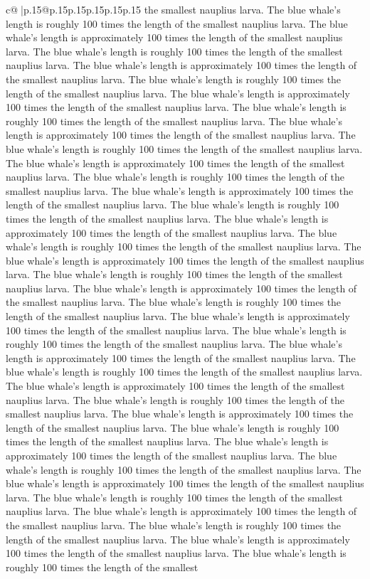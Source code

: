 \documentclass{article}
\begin{document}
{\begin{supertabular}{c@{$\;$}|p{.15\linewidth}@{}p{.15\linewidth}p{.15\linewidth}p{.15\linewidth}p{.15\linewidth}p{.15\linewidth}}
{{{the smallest nauplius larva. The blue whale's length is roughly 100 times the length of the smallest nauplius larva. The blue whale's length is approximately 100 times the length of the smallest nauplius larva. The blue whale's length is roughly 100 times the length of the smallest nauplius larva. The blue whale's length is approximately 100 times the length of the smallest nauplius larva. The blue whale's length is roughly 100 times the length of the smallest nauplius larva. The blue whale's length is approximately 100 times the length of the smallest nauplius larva. The blue whale's length is roughly 100 times the length of the smallest nauplius larva. The blue whale's length is approximately 100 times the length of the smallest nauplius larva. The blue whale's length is roughly 100 times the length of the smallest nauplius larva. The blue whale's length is approximately 100 times the length of the smallest nauplius larva. The blue whale's length is roughly 100 times the length of the smallest nauplius larva. The blue whale's length is approximately 100 times the length of the smallest nauplius larva. The blue whale's length is roughly 100 times the length of the smallest nauplius larva. The blue whale's length is approximately 100 times the length of the smallest nauplius larva. The blue whale's length is roughly 100 times the length of the smallest nauplius larva. The blue whale's length is approximately 100 times the length of the smallest nauplius larva. The blue whale's length is roughly 100 times the length of the smallest nauplius larva. The blue whale's length is approximately 100 times the length of the smallest nauplius larva. The blue whale's length is roughly 100 times the length of the smallest nauplius larva. The blue whale's length is approximately 100 times the length of the smallest nauplius larva. The blue whale's length is roughly 100 times the length of the smallest nauplius larva. The blue whale's length is approximately 100 times the length of the smallest nauplius larva. The blue whale's length is roughly 100 times the length of the smallest nauplius larva. The blue whale's length is approximately 100 times the length of the smallest nauplius larva. The blue whale's length is roughly 100 times the length of the smallest nauplius larva. The blue whale's length is approximately 100 times the length of the smallest nauplius larva. The blue whale's length is roughly 100 times the length of the smallest nauplius larva. The blue whale's length is approximately 100 times the length of the smallest nauplius larva. The blue whale's length is roughly 100 times the length of the smallest nauplius larva. The blue whale's length is approximately 100 times the length of the smallest nauplius larva. The blue whale's length is roughly 100 times the length of the smallest nauplius larva. The blue whale's length is approximately 100 times the length of the smallest nauplius larva. The blue whale's length is roughly 100 times the length of the smallest nauplius larva. The blue whale's length is approximately 100 times the length of the smallest nauplius larva. The blue whale's length is roughly 100 times the length of the smallest }}}
\end{supertabular}}
\end{document}

